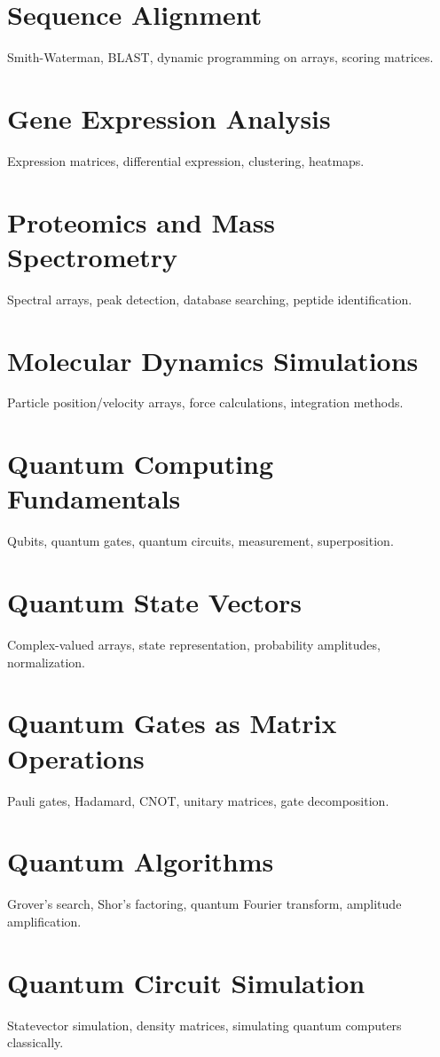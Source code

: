 \chapter{Sequence Alignment}
Smith-Waterman, BLAST, dynamic programming on arrays, scoring matrices.

\chapter{Gene Expression Analysis}
Expression matrices, differential expression, clustering, heatmaps.

\chapter{Proteomics and Mass Spectrometry}
Spectral arrays, peak detection, database searching, peptide identification.

\chapter{Molecular Dynamics Simulations}
Particle position/velocity arrays, force calculations, integration methods.


\chapter{Quantum Computing Fundamentals}
Qubits, quantum gates, quantum circuits, measurement, superposition.

\chapter{Quantum State Vectors}
Complex-valued arrays, state representation, probability amplitudes, normalization.

\chapter{Quantum Gates as Matrix Operations}
Pauli gates, Hadamard, CNOT, unitary matrices, gate decomposition.

\chapter{Quantum Algorithms}
Grover's search, Shor's factoring, quantum Fourier transform, amplitude amplification.

\chapter{Quantum Circuit Simulation}
Statevector simulation, density matrices, simulating quantum computers classically.

